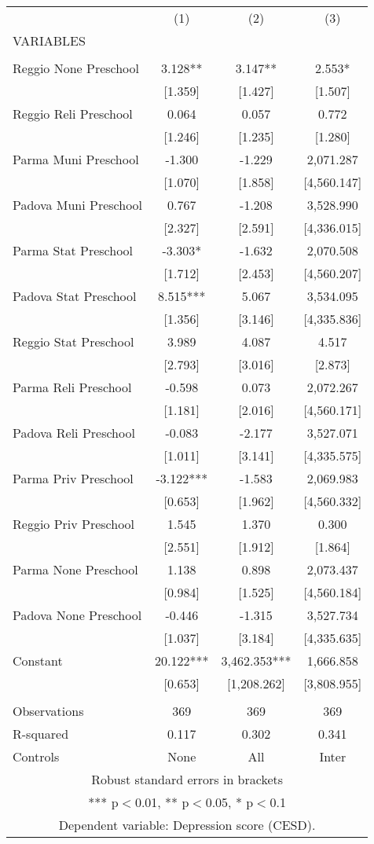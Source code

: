 \begin{tabular}{lccc} \hline
 & (1) & (2) & (3) \\
VARIABLES &  &  &  \\ \hline
 &  &  &  \\
Reggio None Preschool & 3.128** & 3.147** & 2.553* \\
 & [1.359] & [1.427] & [1.507] \\
Reggio Reli Preschool & 0.064 & 0.057 & 0.772 \\
 & [1.246] & [1.235] & [1.280] \\
Parma Muni Preschool & -1.300 & -1.229 & 2,071.287 \\
 & [1.070] & [1.858] & [4,560.147] \\
Padova Muni Preschool & 0.767 & -1.208 & 3,528.990 \\
 & [2.327] & [2.591] & [4,336.015] \\
Parma Stat Preschool & -3.303* & -1.632 & 2,070.508 \\
 & [1.712] & [2.453] & [4,560.207] \\
Padova Stat Preschool & 8.515*** & 5.067 & 3,534.095 \\
 & [1.356] & [3.146] & [4,335.836] \\
Reggio Stat Preschool & 3.989 & 4.087 & 4.517 \\
 & [2.793] & [3.016] & [2.873] \\
Parma Reli Preschool & -0.598 & 0.073 & 2,072.267 \\
 & [1.181] & [2.016] & [4,560.171] \\
Padova Reli Preschool & -0.083 & -2.177 & 3,527.071 \\
 & [1.011] & [3.141] & [4,335.575] \\
Parma Priv Preschool & -3.122*** & -1.583 & 2,069.983 \\
 & [0.653] & [1.962] & [4,560.332] \\
Reggio Priv Preschool & 1.545 & 1.370 & 0.300 \\
 & [2.551] & [1.912] & [1.864] \\
Parma None Preschool & 1.138 & 0.898 & 2,073.437 \\
 & [0.984] & [1.525] & [4,560.184] \\
Padova None Preschool & -0.446 & -1.315 & 3,527.734 \\
 & [1.037] & [3.184] & [4,335.635] \\
Constant & 20.122*** & 3,462.353*** & 1,666.858 \\
 & [0.653] & [1,208.262] & [3,808.955] \\
 &  &  &  \\
Observations & 369 & 369 & 369 \\
R-squared & 0.117 & 0.302 & 0.341 \\
 Controls & None & All & Inter \\ \hline
\multicolumn{4}{c}{ Robust standard errors in brackets} \\
\multicolumn{4}{c}{ *** p$<$0.01, ** p$<$0.05, * p$<$0.1} \\
\multicolumn{4}{c}{ Dependent variable: Depression score (CESD).} \\
\end{tabular}

